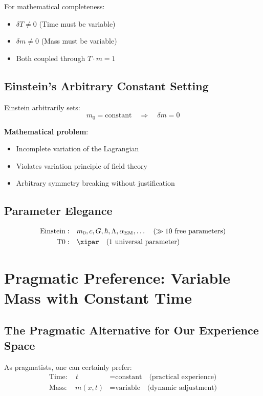 	For mathematical completeness:
	\begin{itemize}
		\item $\delta T \neq 0$ (Time must be variable)
		\item $\delta m \neq 0$ (Mass must be variable)
		\item Both coupled through $T \cdot m = 1$
	\end{itemize}
	
	\subsection{Einstein's Arbitrary Constant Setting}
	
	Einstein arbitrarily sets:
	\begin{equation}
		m_0 = \text{constant} \quad \Rightarrow \quad \delta m = 0
	\end{equation}
	
	\textbf{Mathematical problem}:
	\begin{itemize}
		\item Incomplete variation of the Lagrangian
		\item Violates variation principle of field theory
		\item Arbitrary symmetry breaking without justification
	\end{itemize}
	
	\subsection{Parameter Elegance}
	
	\begin{align}
		\text{Einstein}: \quad &m_0, c, G, \hbar, \Lambda, \alpha_{\text{EM}}, \ldots \quad (\gg 10 \text{ free parameters}) \\
		\text{T0}: \quad &\xipar \quad (1 \text{ universal parameter})
	\end{align}
	
	\section{Pragmatic Preference: Variable Mass with Constant Time}
	
	\subsection{The Pragmatic Alternative for Our Experience Space}
	
	As pragmatists, one can certainly prefer:
	\begin{align}
		\text{Time}: \quad t &= \text{constant} \quad \text{(practical experience)} \\
		\text{Mass}: \quad m(x,t) &= \text{variable} \quad \text{(dynamic adjustment)}
	\end{align}
	
